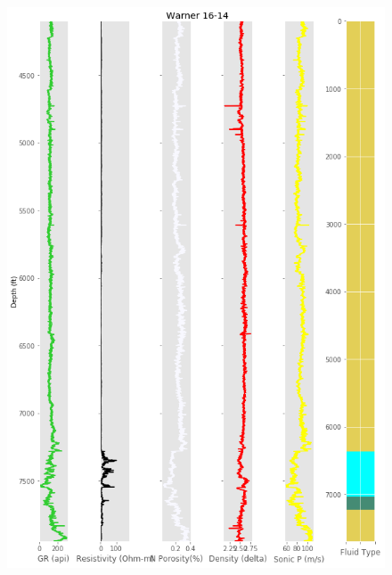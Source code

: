 \documentclass[11pt, a4paper]{article}
\begin{document}
   \begin{figure}[h!]
  \includegraphics[width=\linewidth]{w2}
\end{figure}
\end{document}
